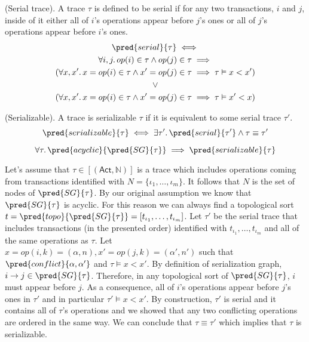  (Serial trace). A trace $\tau$ is defined to be serial if for any two transactions, $i$ and $j$, inside of it either all of $i$'s operations appear before $j$'s ones or all of $j$'s operations appear before $i$'s ones.
\begin{gather*}
	\pred{serial}{\tau} \iff \\
	\forall i, j \ldotp op(i) \in \tau \land op(j) \in \tau \implies \\
	(\forall x, x' \ldotp x = op(i) \in \tau \land x' = op(j) \in \tau \implies \tau \vDash x < x') \\
	\lor \\
	(\forall x, x' \ldotp x = op(i) \in \tau \land x' = op(j) \in \tau \implies \tau \vDash x' < x)
\end{gather*}

 (Serializable). A trace is serializable $\tau$ if it is equivalent to some serial trace $\tau'$.
\[
	\pred{serializable}{\tau} \iff \exists \tau' \ldotp \pred{serial}{\tau'} \land \tau \equiv \tau'
\]

\thm
\[
	\forall \tau \ldotp \pred{acyclic}{\pred{SG}{\tau}} \implies \pred{serializable}{\tau}
\]

Let's assume that $\tau \in [(\mathsf{Act}, \mathds{N})]$ is a trace which includes operations coming from transactions identified with $N = \{ \iota_1, \ldots, \iota_m \}$. It follows that $N$ is the set of nodes of $\pred{SG}{\tau}$. By our original assumption we know that $\pred{SG}{\tau}$ is acyclic. For this reason we can always find a topological sort $t = \pred{topo}{\pred{SG}{\tau}} = [t_{\iota_1}, \ldots, t_{\iota_m}]$. Let $\tau'$ be the serial trace that includes transactions (in the presented order) identified with $t_{\iota_1}, \ldots, t_{\iota_m}$ and all of the same operations as $\tau$. Let $x = op(i, k) = (\alpha, n), x' = op(j, k) = (\alpha', n')$ such that $\pred{conflict}{\alpha, \alpha'}$ and $\tau \vDash x < x'$. By definition of serialization graph, $i \rightarrow j \in \pred{SG}{\tau}$. Therefore, in any topological sort of $\pred{SG}{\tau}$, $i$ must appear before $j$. As a consequence, all of $i$'s operations appear before $j$'s ones in $\tau'$ and in particular $\tau' \vDash x < x'$. By construction, $\tau'$ is serial and it contains all of $\tau$'s operations and we showed that any two conflicting operations are ordered in the same way. We can conclude that $\tau \equiv \tau'$ which implies that $\tau$ is serializable.